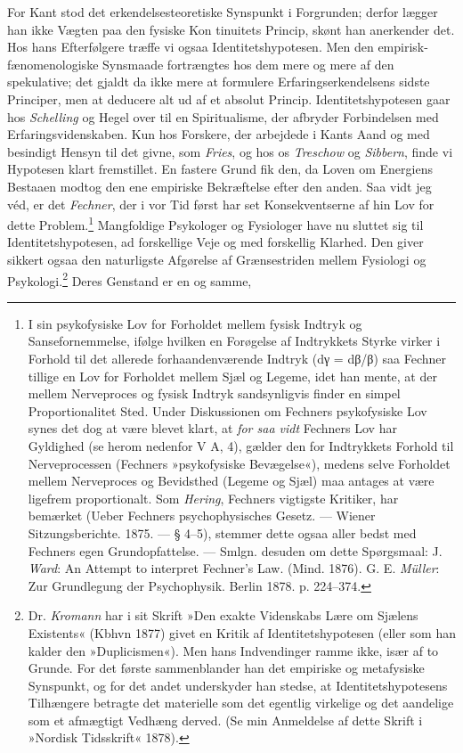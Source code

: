 \documentclass[12pt,a4paper,openany]{book}
\newcommand{\opage}[1]{\marginnote{\footnotesize\textit{[#1]}}}
\begin{document}
For Kant stod det erkendelsesteoretiske Synspunkt i Forgrunden; derfor
lægger han ikke Vægten paa den fysiske Kon%
\opage{83}tinuitets Princip, skønt han anerkender det. Hos hans
Efterfølgere træffe vi ogsaa Identitetshypotesen. Men den
empirisk-fænomenologiske Synsmaade fortrængtes hos dem mere og mere af
den spekulative; det gjaldt da ikke mere at formulere
Erfaringserkendelsens sidste Principer, men at deducere alt ud af et
absolut Princip. Identitetshypotesen gaar hos \emph{Schelling} og Hegel
over til en Spiritualisme, der afbryder Forbindelsen med
Erfaringsvidenskaben. Kun hos Forskere, der arbejdede i Kants Aand og
med besindigt Hensyn til det givne, som \emph{Fries}, og hos os
\emph{Treschow} og \emph{Sibbern}, finde vi Hypotesen klart fremstillet.
En fastere Grund fik den, da Loven om Energiens Bestaaen modtog den ene
empiriske Bekræftelse efter den anden. Saa vidt jeg véd, er det
\emph{Fechner}, der i vor Tid først har set Konsekventserne af hin Lov
for dette Problem.\footnote[1]{I sin psykofysiske Lov for Forholdet
mellem fysisk Indtryk og Sansefornemmelse, ifølge hvilken en Forøgelse
af Indtrykkets Styrke virker i Forhold til det allerede
forhaandenværende Indtryk (dγ = dβ/β) saa Fechner tillige en Lov for
Forholdet mellem Sjæl og Legeme, idet han mente, at der mellem
Nerveproces og fysisk Indtryk sandsynligvis finder en simpel
Proportionalitet Sted. Under Diskussionen om Fechners psykofysiske Lov
synes det dog at være blevet klart, at \emph{for saa vidt} Fechners Lov
har Gyldighed (se herom nedenfor V A, 4), gælder den for Indtrykkets
Forhold til Nerveprocessen (Fechners »psykofysiske Bevægelse«), medens
selve Forholdet mellem Nerveproces og Bevidsthed (Legeme og Sjæl) maa
antages at være ligefrem proportionalt. Som \emph{Hering}, Fechners
vigtigste Kritiker, har bemærket (Ueber Fechners psychophysisches
Gesetz. --- Wiener Sitzungsberichte. 1875. --- § 4--5), stemmer dette
ogsaa aller bedst med Fechners egen Grundopfattelse. --- Smlgn. desuden
om dette Spørgsmaal: J. \emph{Ward}: An Attempt to interpret Fechner’s
Law. (Mind. 1876). G. E. \emph{Müller}: Zur Grundlegung der
Psychophysik. Berlin 1878. p. 224--374.} Mangfoldige Psykologer og
Fysiologer have nu sluttet sig til Identitetshypotesen, ad forskellige
Veje og med forskellig Klarhed. Den giver sikkert ogsaa den naturligste
Afgørelse af Grænsestriden mellem Fysiologi og
Psykologi.\footnote[2]{Dr. \emph{Kromann} har i sit Skrift »Den exakte
Videnskabs Lære om Sjælens Existents« (Kbhvn 1877) givet en Kritik af
Identitetshypotesen (eller som han kalder den »Duplicismen«). Men hans
Indvendinger ramme ikke, især af to Grunde. For det første sammenblander
han det empiriske og metafysiske Synspunkt, og for det andet underskyder
han stedse, at Identitetshypotesens Tilhængere betragte det materielle
som det egentlig virkelige og det aandelige som et afmægtigt Vedhæng
derved. (Se min Anmeldelse af dette Skrift i »Nordisk Tidsskrift«
1878).} Deres Genstand er en og samme,
\end{document}
